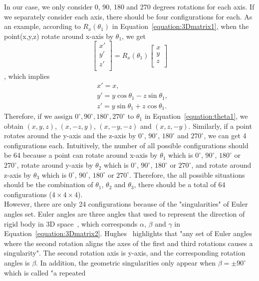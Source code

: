 In our case, we only consider 0, 90, 180 and 270 degrees rotations for each axis. If we separately consider each axis, there should be four configurations for each. As an example, according to $R_{x}(\theta_{1})$ in Equation~\ref{equation:3Dmatrix1}, when the point(x,y,z) rotate around x-axis by $\theta_{1}$, we get
\begin{equation}
\begin{bmatrix}
x'\\
y'\\
z'\\
\end{bmatrix}
=R_{x}(\theta_{1})
\begin{bmatrix}
x\\
y\\
z\\
\end{bmatrix}
\end{equation}, which implies
\begin{equation}
\label{equation:theta1}
\begin{aligned}
&x'=x,\\
&y'=y\cos\theta_{1}-z\sin\theta_{1},\\
&z'=y\sin\theta_{1}+z\cos\theta_{1}.
\end{aligned}
\end{equation}
Therefore, if we assign $0^{\circ}, 90^{\circ}, 180^{\circ}, 270^{\circ}$ to $\theta_{1}$ in Equation~\ref{equation:theta1}, we obtain $(x,y,z)$, $(x,-z,y)$, $(x,-y,-z)$ and $(x,z,-y)$.
Similarly, if a point rotates around the y-axis and the z-axis by $0^{\circ}$, $90^{\circ}$, $180^{\circ}$ and $270^{\circ}$, we can get 4 configurations each. Intuitively, the number of all possible configurations should be 64 because a point can rotate around x-axis by $\theta_{1}$ which is $0^{\circ}$, $90^{\circ}$, $180^{\circ}$ or $270^{\circ}$, rotate around y-axis by $\theta_{2}$ which is $0^{\circ}$, $90^{\circ}$, $180^{\circ}$ or $270^{\circ}$, and rotate around z-axis by $\theta_{3}$ which is $0^{\circ}$, $90^{\circ}$, $180^{\circ}$ or $270^{\circ}$. Therefore, the all possible situations should be the combination of $\theta_{1}$, $\theta_{2}$ and $\theta_{3}$, there should be a total of 64 configurations ($4\times 4 \times 4$). \\However, there are only 24 configurations because of the "singularities" of Euler angles set. Euler angles are three angles that used to represent the direction of rigid body in 3D space~\cite{r24}, which corresponds $\alpha$, $\beta$ and $\gamma$ in Equation~\ref{equation:3Dmatrix2}. Hughes~\cite{r19} highlights that "any set of Euler angles where the second rotation aligns the axes of the first and third rotations causes a singularity". The second rotation axis is y-axis, and the corresponding rotation angles is $\beta$. In addition, the geometric singularities only appear when $\beta=\pm90^{\circ}$ which is called "a repeated
